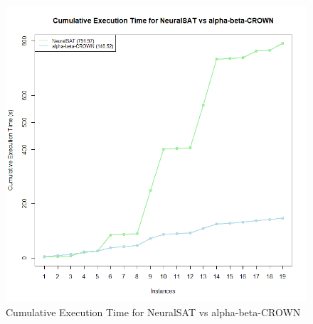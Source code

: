 \begin{figure}[h]
\centering 
\includegraphics[width=0.8\linewidth]{imagini/interpretare rezultate/cumulative_NeuralSAT_vs_abC.png}
\caption{Cumulative Execution Time for NeuralSAT vs alpha-beta-CROWN}
\label{fig:image4} 
\end{figure}
\



